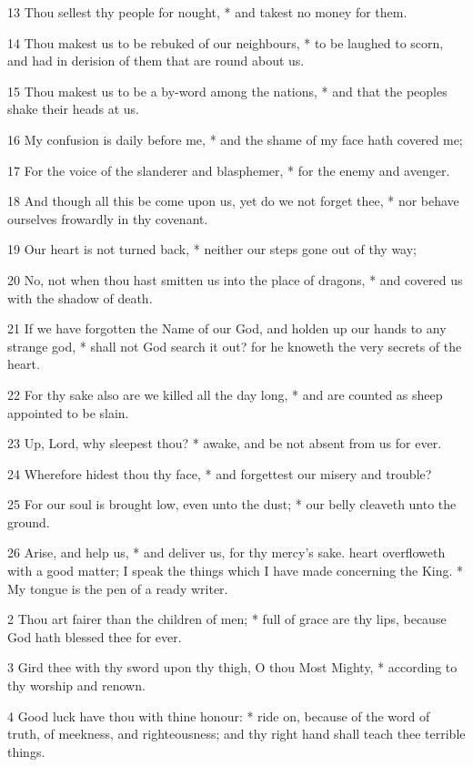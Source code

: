 13 Thou sellest thy people for nought, * and takest no money for them.\par
14 Thou makest us to be rebuked of our neighbours, * to be laughed to scorn, and had in derision of them that are round about us.\par
15 Thou makest us to be a by-word among the nations, * and that the peoples shake their heads at us.\par
16 My confusion is daily before me, * and the shame of my face hath covered me;\par
17 For the voice of the slanderer and blasphemer, * for the enemy and avenger.\par
18 And though all this be come upon us, yet do we not forget thee, * nor behave ourselves frowardly in thy covenant.\par
19 Our heart is not turned back, * neither our steps gone out of thy way;\par
20 No, not when thou hast smitten us into the place of dragons, * and covered us with the shadow of death.\par
21 If we have forgotten the Name of our God, and holden up our hands to any strange god, * shall not God search it out? for he knoweth the very secrets of the heart.\par
22 For thy sake also are we killed all the day long, * and are counted as sheep appointed to be slain.\par
23 Up, Lord, why sleepest thou? * awake, and be not absent from us for ever.\par
24 Wherefore hidest thou thy face, * and forgettest our misery and trouble?\par
25 For our soul is brought low, even unto the dust; * our belly cleaveth unto the ground.\par
26 Arise, and help us, * and deliver us, for thy mercy's sake.
 heart overfloweth with a good matter; I speak the things which I have made concerning the King. * My tongue is the pen of a ready writer.\par
2 Thou art fairer than the children of men; * full of grace are thy lips, because God hath blessed thee for ever.\par
3 Gird thee with thy sword upon thy thigh, O thou Most Mighty, * according to thy worship and renown.\par
4 Good luck have thou with thine honour: * ride on, because of the word of truth, of meekness, and righteousness; and thy right hand shall teach thee terrible things.\par

